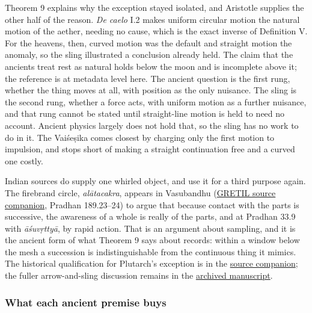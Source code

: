\documentclass[11pt,a4paper]{article}
\begin{document}
Theorem 9 explains why the exception stayed isolated, and Aristotle
supplies the other half of the reason. \emph{De caelo} I.2 makes uniform
circular motion the natural motion of the aether, needing no cause,
which is the exact inverse of Definition V. For the heavens, then,
curved motion was the default and straight motion the anomaly, so the
sling illustrated a conclusion already held. The claim that the ancients
treat rest as natural holds below the moon and is incomplete above it;
the reference is at metadata level here. The ancient question is the
first rung, whether the thing moves at all, with position as the only
nuisance. The sling is the second rung, whether a force acts, with
uniform motion as a further nuisance, and that rung cannot be stated
until straight-line motion is held to need no account. Ancient physics
largely does not hold that, so the sling has no work to do in it. The
Vaiśeṣika comes closest by charging only the first motion to impulsion,
and stops short of making a straight continuation free and a curved one
costly.

Indian sources do supply one whirled object, and use it for a third
purpose again. The firebrand circle, \emph{alātacakra}, appears in
Vasubandhu
(\href{../docs/classics/Abhidharmakosabhasya_motion_atoms_GRETIL.md}{GRETIL
source companion}, Pradhan 189.23--24) to argue that because contact
with the parts is successive, the awareness of a whole is really of the
parts, and at Pradhan 33.9 with \emph{āśuvṛttyā}, by rapid action. That
is an argument about sampling, and it is the ancient form of what
Theorem 9 says about records: within a window below the mesh a
succession is indistinguishable from the continuous thing it mimics. The
historical qualification for Plutarch's exception is in the
\href{../docs/classics/Plutarch_DeFacie_923_sling_moon.md}{source
companion}; the fuller arrow-and-sling discussion remains in the
\href{../out/papers/arrow-not-sling.pdf}{archived manuscript}.

\hypertarget{what-each-ancient-premise-buys}{%
\subsubsection{What each ancient premise
buys}\label{what-each-ancient-premise-buys}}
\end{document}
